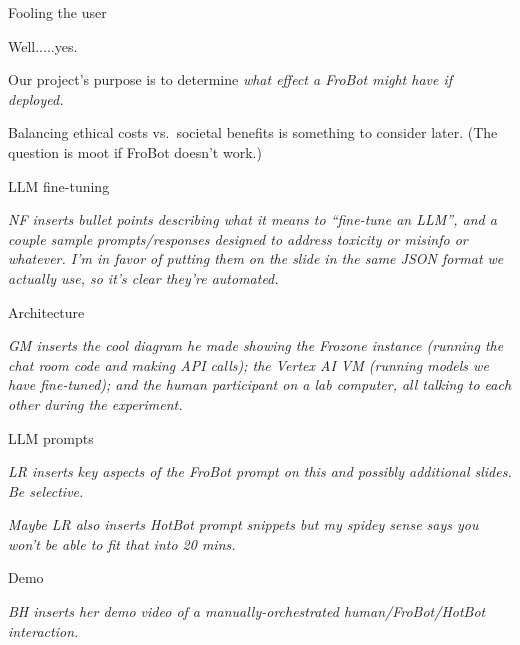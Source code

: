 \documentclass[12pt]{beamer}
\begin{document}
\begin{frame}[c]{Fooling the user}
\pause

Well.....yes.

\pause

Our project's purpose is to determine \textit{what effect a FroBot might have if deployed.}

Balancing ethical costs vs.~societal benefits is something to consider later. (The question is moot if FroBot doesn't work.)

\end{frame}
\begin{frame}[c]{LLM fine-tuning}

\textit{NF inserts bullet points describing what it means to ``fine-tune an LLM'', and a couple sample prompts/responses designed to address toxicity or misinfo or whatever. I'm in favor of putting them on the slide in the same JSON format we actually use, so it's clear they're automated.}

\end{frame}
\begin{frame}[c]{Architecture}

\textit{GM inserts the cool diagram he made showing the Frozone instance (running the chat room code and making API calls); the Vertex AI VM (running models we have fine-tuned); and the human participant on a lab computer, all talking to each other during the experiment.}

\end{frame}
\begin{frame}[c]{LLM prompts}

\textit{LR inserts key aspects of the FroBot prompt on this and possibly additional slides. Be selective.}

\textit{Maybe LR also inserts HotBot prompt snippets but my spidey sense says you won't be able to fit that into 20 mins.}

\end{frame}
\begin{frame}[c]{Demo}

\textit{BH inserts her demo video of a manually-orchestrated human/FroBot/HotBot interaction.}

\end{frame}
\end{document}
